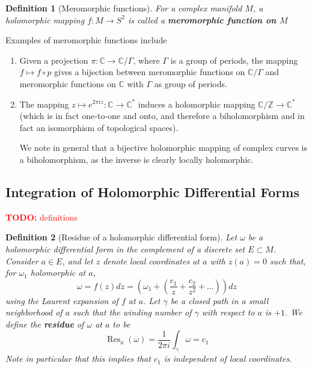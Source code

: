 \documentclass{article}
\newcommand{\mbb}[1]{\mathbb{#1}}
\newtheorem{definition}{Definition}
\DeclareMathOperator{\Res}{Res}
\newcommand{\TODO}[1]{\begin{center}\huge{\textcolor{red}{\textbf{TODO:} #1}}\end{center}}
\begin{document}
\begin{definition}[Meromorphic functions]
For a complex manifold \(M\), a holomorphic mapping \(f: M \to S^2\) is called a \textbf{meromorphic function on \(M\)}
\end{definition}

Examples of meromorphic functions include
\begin{enumerate}

  \item Given a projection \(\pi: \mbb{C} \to \mbb{C}/\Gamma\), where \(\Gamma\) is a group of periods, the mapping \(f \mapsto f \circ p\) gives a bijection between meromorphic functions on \(\mbb{C}/\Gamma\) and meromorphic functions on \(\mbb{C}\) with \(\Gamma\) as group of periods.

  \item The mapping \(z \mapsto e^{2\pi iz}: \mbb{C} \to \mbb{C}^*\) induces a holomorphic mapping \(\mbb{C}/\mbb{Z} \to \mbb{C}^*\) (which is in fact one-to-one and onto, and therefore a biholomorphism and in fact an isomorphism of topological spaces).

  We note in general that a bijective holomorphic mapping of complex curves is a biholomorphism, as the inverse is clearly locally holomorphic.

\end{enumerate}

\subsection{Integration of Holomorphic Differential Forms}

\TODO{definitions}

\begin{definition}[Residue of a holomorphic differential form]
Let \(\omega\) be a holomorphic differential form in the complement of a discrete set \(E \subset M\). Consider \(a \in E\), and let \(z\) denote local coordinates at \(a\) with \(z(a) = 0\) such that, for \(\omega_1\) holomorphic at \(a\),
\begin{equation}\omega = f(z)dz = \left(\omega_1 + \left(\frac{c_1}{z} + \frac{c_2}{z^2} + ...\right)\right)dz\end{equation}
using the Laurent expansion of \(f\) at \(a\). Let \(\gamma\) be a closed path in a small neighborhood of \(a\) such that the winding number of \(\gamma\) with respect to \(a\) is \(+1\). We define the \textbf{residue} of \(\omega\) at \(a\) to be
\begin{equation}\Res_a(\omega) = \frac{1}{2\pi i}\int_\gamma\omega = c_1\end{equation}
Note in particular that this implies that \(c_1\) is independent of local coordinates.
\end{definition}
\end{document}
